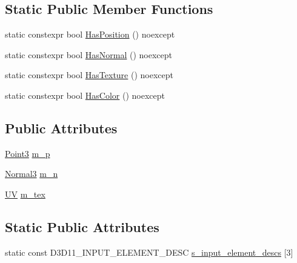 \subsection*{Static Public Member Functions}
\begin{DoxyCompactItemize}
\item 
static constexpr bool \mbox{\hyperlink{structmage_1_1rendering_1_1_vertex_position_normal_texture_a5cde27475fae5b650d91ccba4e6a2a8d}{Has\+Position}} () noexcept
\item 
static constexpr bool \mbox{\hyperlink{structmage_1_1rendering_1_1_vertex_position_normal_texture_a5b65b49d120fd660977f8f05b3ee7327}{Has\+Normal}} () noexcept
\item 
static constexpr bool \mbox{\hyperlink{structmage_1_1rendering_1_1_vertex_position_normal_texture_afebe9b59273a84b1ad78f2209d8f500e}{Has\+Texture}} () noexcept
\item 
static constexpr bool \mbox{\hyperlink{structmage_1_1rendering_1_1_vertex_position_normal_texture_abe3243efa83a9d4d28cf56282ba5b793}{Has\+Color}} () noexcept
\end{DoxyCompactItemize}
\subsection*{Public Attributes}
\begin{DoxyCompactItemize}
\item 
\mbox{\hyperlink{structmage_1_1_point3}{Point3}} \mbox{\hyperlink{structmage_1_1rendering_1_1_vertex_position_normal_texture_a6e41b77f1a21c4eb9f49cf936c131aee}{m\+\_\+p}}
\item 
\mbox{\hyperlink{structmage_1_1_normal3}{Normal3}} \mbox{\hyperlink{structmage_1_1rendering_1_1_vertex_position_normal_texture_a7c800b1234a9291361a21ce2289b1394}{m\+\_\+n}}
\item 
\mbox{\hyperlink{structmage_1_1_u_v}{UV}} \mbox{\hyperlink{structmage_1_1rendering_1_1_vertex_position_normal_texture_a8390daa0e3fd706ff42b32a62a935c3c}{m\+\_\+tex}}
\end{DoxyCompactItemize}
\subsection*{Static Public Attributes}
\begin{DoxyCompactItemize}
\item 
static const D3\+D11\+\_\+\+I\+N\+P\+U\+T\+\_\+\+E\+L\+E\+M\+E\+N\+T\+\_\+\+D\+E\+SC \mbox{\hyperlink{structmage_1_1rendering_1_1_vertex_position_normal_texture_a5f3ec0cb5a7957fda248bad573caee44}{s\+\_\+input\+\_\+element\+\_\+descs}} \mbox{[}3\mbox{]}
\end{DoxyCompactItemize}


